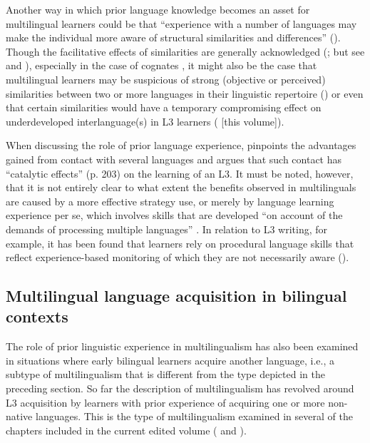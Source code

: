 \documentclass[output=paper,colorlinks,citecolor=brown,nonflat]{../langscibook}
\begin{document}
Another way in which prior language knowledge becomes an asset for multilingual learners could be that “experience with a number of languages may make the individual more aware of structural similarities and differences” (\citealt[11]{McLaughlinNayak1989}). Though the facilitative effects of similarities are generally acknowledged (\citealt{Ringbom2007, RutgersEvans2017}; but see \citealt{SwainEtAl1990} and \citealt{GibsonEtAl2001}), especially in the case of cognates , it might also be the case that multilingual learners may be suspicious of strong (objective or perceived) similarities between two or more languages in their linguistic repertoire (\citealt{Fouser2001, OtwinowskaSzewczyk2017}) or even that certain similarities would have a temporary compromising effect on underdeveloped interlanguage(s) in L3 learners (\citealt{BardelFalk2007, Rast2010, Sánchez2012,chapters/sanchez7} [this volume]).

When discussing the role of prior language experience, \citet{Jessner1999} pinpoints the advantages gained from contact with several languages and argues that such contact has “catalytic effects” (p. 203) on the learning of an L3. It must be noted, however, that it is not entirely clear to what extent the benefits observed in multilinguals are caused by a more effective strategy use, or merely by language learning experience per se, which involves skills that are developed “on account of the demands of processing multiple languages” \citep[243]{Kemp2007}. In relation to L3 writing, for example, it has been found that learners rely on procedural language skills that reflect experience-based monitoring of which they are not necessarily aware (\citealt{RutgersEvans2017}).

\subsection{Multilingual language acquisition in bilingual contexts}\label{sec:sanchez1:1.2}

The role of prior linguistic experience in multilingualism has also been examined in situations where early bilingual learners acquire another language, i.e., a subtype of multilingualism that is different from the type depicted in the preceding section. So far the description of multilingualism has revolved around L3 acquisition by learners with prior experience of acquiring one or more non-native languages. This is the type of multilingualism examined in several of the chapters included in the current edited volume (\citeauthor{chapters/gudmundson, chapters/salaberry, chapters/sanchez7, chapters/sciutti} and \citeauthor{chapters/stadt}).
\end{document}
